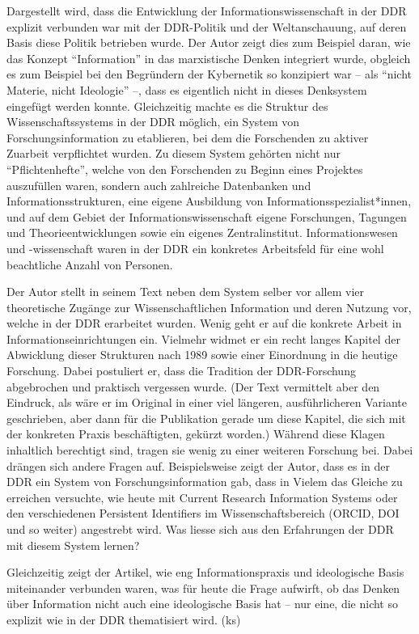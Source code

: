 \documentclass[a4paper,
fontsize=11pt,
oneside,
numbers=noperiodatend,
parskip=half-,
bibliography=totoc,
final
]{scrartcl}
\begin{document}
Dargestellt wird, dass die Entwicklung der Informationswissenschaft in
der DDR explizit verbunden war mit der DDR-Politik und der
Weltanschauung, auf deren Basis diese Politik betrieben wurde. Der Autor
zeigt dies zum Beispiel daran, wie das Konzept \enquote{Information} in das
marxistische Denken integriert wurde, obgleich es zum Beispiel bei den
Begründern der Kybernetik so konzipiert war -- als \enquote{nicht Materie, nicht
Ideologie} --, dass es eigentlich nicht in dieses Denksystem eingefügt
werden konnte. Gleichzeitig machte es die Struktur des
Wissenschaftssystems in der DDR möglich, ein System von
Forschungsinformation zu etablieren, bei dem die Forschenden zu aktiver
Zuarbeit verpflichtet wurden. Zu diesem System gehörten nicht nur
\enquote{Pflichtenhefte}, welche von den Forschenden zu Beginn eines Projektes
auszufüllen waren, sondern auch zahlreiche Datenbanken und
Informationsstrukturen, eine eigene Ausbildung von
Informationsspezialist*innen, und auf dem Gebiet der
Informationswissenschaft eigene Forschungen, Tagungen und
Theorieentwicklungen sowie ein eigenes Zentralinstitut.
Informationswesen und -wissenschaft waren in der DDR ein konkretes
Arbeitsfeld für eine wohl beachtliche Anzahl von Personen.

Der Autor stellt in seinem Text neben dem System selber vor allem vier
theoretische Zugänge zur Wissenschaftlichen Information und deren
Nutzung vor, welche in der DDR erarbeitet wurden. Wenig geht er auf die
konkrete Arbeit in Informationseinrichtungen ein. Vielmehr widmet er ein
recht langes Kapitel der Abwicklung dieser Strukturen nach 1989 sowie
einer Einordnung in die heutige Forschung. Dabei postuliert er, dass die
Tradition der DDR-Forschung abgebrochen und praktisch vergessen wurde.
(Der Text vermittelt aber den Eindruck, als wäre er im Original in einer
viel längeren, ausführlicheren Variante geschrieben, aber dann für die
Publikation gerade um diese Kapitel, die sich mit der konkreten Praxis
beschäftigten, gekürzt worden.) Während diese Klagen inhaltlich
berechtigt sind, tragen sie wenig zu einer weiteren Forschung bei. Dabei
drängen sich andere Fragen auf. Beispielsweise zeigt der Autor, dass es
in der DDR ein System von Forschungsinformation gab, dass in Vielem das
Gleiche zu erreichen versuchte, wie heute mit Current Research
Information Systems oder den verschiedenen Persistent Identifiers im
Wissenschaftsbereich (ORCID, DOI und so weiter) angestrebt wird. Was
liesse sich aus den Erfahrungen der DDR mit diesem System lernen?

Gleichzeitig zeigt der Artikel, wie eng Informationspraxis und
ideologische Basis miteinander verbunden waren, was für heute die Frage
aufwirft, ob das Denken über Information nicht auch eine ideologische
Basis hat -- nur eine, die nicht so explizit wie in der DDR thematisiert
wird. (ks)
\end{document}

